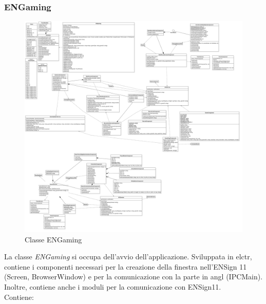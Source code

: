\subsubsection{ENGaming}
\begin{figure}[h]
    \centering
    \includegraphics[width=340pt]{images/prog/ENGaming.png}
    \caption{Classe ENGaming}
    \label{fig:engaming}
\end{figure}
La classe \emph{ENGaming} si occupa dell'avvio dell'applicazione. Sviluppata in \gls{elctr}, contiene i componenti necessari per la creazione della finestra nell'ENSign 11 (Screen, BrowserWindow) e per la comunicazione con la parte in \gls{angl} (IPCMain).
Inoltre, contiene anche i moduli per la comunicazione con ENSign11.\\
Contiene:
